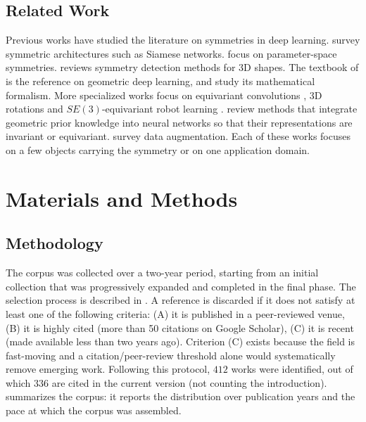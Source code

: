 \documentclass[mathematics,review,submit,moreauthors]{Definitions/mdpi}
\begin{document}
\subsection{Related Work}\label{sec:related-work}
Previous works have studied the literature on symmetries in deep learning.
\citet{ilina2022sa} survey symmetric architectures such as Siamese networks.
\citet{zhao2025} focus on parameter-space symmetries.
\citet{sipiran202523scgpis} reviews symmetry detection methods for 3D shapes.
The textbook of \citet{bronstein2021} is the reference on geometric deep learning, and \citet{gerken2021,carlsson2025} study its mathematical formalism.
More specialized works focus on equivariant convolutions \citep{basheer2025ijdsa,habte2023}, 3D rotations \citep{fei2024air} and $SE(3)$-equivariant robot learning \citep{seo2025a}.
\citet{rath2024air} review methods that integrate geometric prior knowledge into neural networks so that their representations are invariant or equivariant.
\citet{shorten2019jbd,mumuni2022a} survey data augmentation.
Each of these works focuses on a few objects carrying the symmetry or on one application domain.

\section{Materials and Methods}\label{sec:materials-methods}

\subsection{Methodology}
The corpus was collected over a two-year period, starting from an initial collection that was progressively expanded and completed in the final phase.
The selection process is described in .
A reference is discarded if it does not satisfy at least one of the following criteria: (A) it is published in a peer-reviewed venue, (B) it is highly cited (more than 50 citations on Google Scholar), (C) it is recent (made available less than two years ago).
Criterion (C) exists because the field is fast-moving and a citation/peer-review threshold alone would systematically remove emerging work.
Following this protocol, $412$ works were identified, out of which $336$ are cited in the current version (not counting the introduction).
 summarizes the corpus: it reports the distribution over publication years and the pace at which the corpus was assembled.
\end{document}
